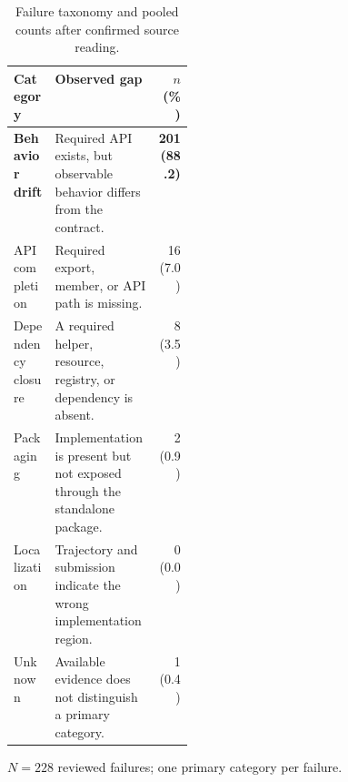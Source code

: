 \begin{table}[tbp]
  \centering
  \footnotesize
  \caption{Failure taxonomy and pooled counts after confirmed source reading.}
  \label{tab:failure-analysis}
  \begin{tabularx}{\linewidth}{@{}p{0.23\linewidth}Xr@{}}
    \toprule
    Category & Observed gap & $n$ (\%) \\
    \midrule
    \textbf{Behavior drift} & Required API exists, but observable behavior differs from the contract. & \textbf{201 (88.2)} \\
    API completion & Required export, member, or API path is missing. & 16 (7.0) \\
    Dependency closure & A required helper, resource, registry, or dependency is absent. & 8 (3.5) \\
    Packaging & Implementation is present but not exposed through the standalone package. & 2 (0.9) \\
    Localization & Trajectory and submission indicate the wrong implementation region. & 0 (0.0) \\
    Unknown & Available evidence does not distinguish a primary category. & 1 (0.4) \\
    \bottomrule
  \end{tabularx}
  \par\smallskip\begin{minipage}{\linewidth}\scriptsize
  $N=228$ reviewed failures; one primary category per failure.
  \end{minipage}
\end{table}
